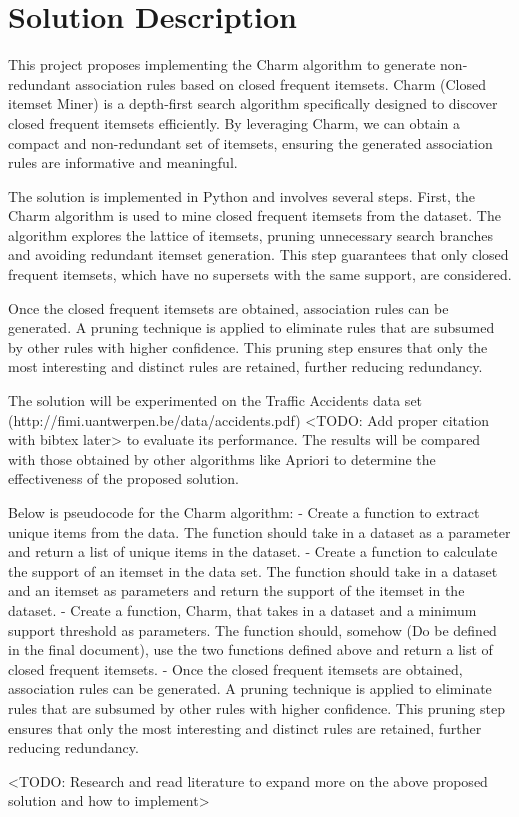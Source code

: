 \chapter{Solution Description}
\label{chap:solution-description}

This project proposes implementing the Charm algorithm to generate non-redundant association rules based on closed frequent itemsets. Charm (Closed itemset Miner) is a depth-first search algorithm specifically designed to discover closed frequent itemsets efficiently. By leveraging Charm, we can obtain a compact and non-redundant set of itemsets, ensuring the generated association rules are informative and meaningful.

The solution is implemented in Python and involves several steps. First, the Charm algorithm is used to mine closed frequent itemsets from the dataset. The algorithm explores the lattice of itemsets, pruning unnecessary search branches and avoiding redundant itemset generation. This step guarantees that only closed frequent itemsets, which have no supersets with the same support, are considered.

Once the closed frequent itemsets are obtained, association rules can be generated. A pruning technique is applied to eliminate rules that are subsumed by other rules with higher confidence. This pruning step ensures that only the most interesting and distinct rules are retained, further reducing redundancy.

The solution will be experimented on the Traffic Accidents data set (http://fimi.uantwerpen.be/data/accidents.pdf) <TODO: Add proper citation with bibtex later> to evaluate its performance. The results will be compared with those obtained by other algorithms like Apriori to determine the effectiveness of the proposed solution.

Below is pseudocode for the Charm algorithm:
- Create a function to extract unique items from the data. The function should take in a dataset as a parameter and return a list of unique items in the dataset.
- Create a function to calculate the support of an itemset in the data set. The function should take in a dataset and an itemset as parameters and return the support of the itemset in the dataset.
- Create a function, Charm, that takes in a dataset and a minimum support threshold as parameters. The function should, somehow (Do be defined in the final document), use the two functions defined above and return a list of closed frequent itemsets.
- Once the closed frequent itemsets are obtained, association rules can be generated. A pruning technique is applied to eliminate rules that are subsumed by other rules with higher confidence. This pruning step ensures that only the most interesting and distinct rules are retained, further reducing redundancy.

<TODO: Research and read literature to expand more on the above proposed solution and how to implement>